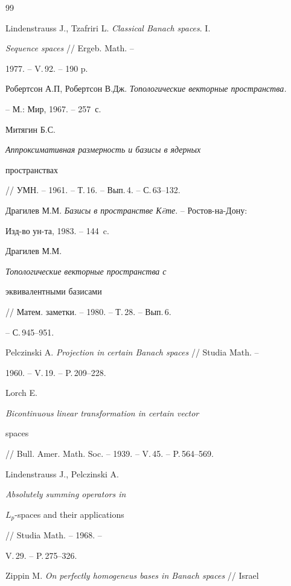 \begin{thebibliography}{99}







Lindenstrauss J., Tzafriri L. {\em Classical Banach spaces}. I.


{\em Sequence spaces} // Ergeb. Math. -- 


1977. -- V.\,92. -- 190 p.




Робертсон А.П, Робертсон В.Дж. {\em Топологические векторные пространства.}


-- М.: Мир, 1967. -- 257~с.




Митягин Б.С. {\em Аппроксимативная размерность и базисы в ядерных


пространствах} // УМН. -- 1961. -- Т.\,16. -- Вып.\,4. -- С.\,63--132.




Драгилев М.М. {\em Базисы в пространстве К\"eте}. -- Ростов-на-Дону:


Изд-во ун-та, 1983. -- 144~c.




Драгилев М.М. {\em Топологические векторные пространства с


эквивалентными базисами} // Матем. заметки. -- 1980. -- Т.\,28. -- Вып.\,6.


-- С.\,945--951.




Pelczinski A. {\em Projection in certain Banach spaces} // Studia Math. --


1960. -- V.\,19. -- P.\,209--228.




Lorch E. {\em Bicontinuous linear transformation in certain vector


spaces} // Bull. Amer. Math. Soc. -- 1939. -- V.\,45. -- P.\,564--569.




Lindenstrauss J., Pelczinski A. {\em Absolutely summing operators in


$L_p$-spaces and their applications} // Studia Math. -- 1968. --


V.\,29. -- P.\,275--326.




Zippin M. {\em On perfectly homogeneus bases in Banach spaces} // Israel



\end{thebibliography}
